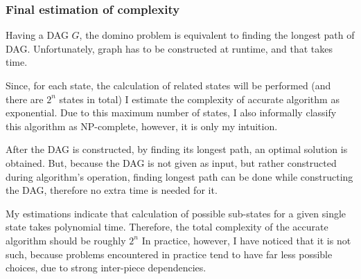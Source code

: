 \subsubsection{Final estimation of complexity}
Having a DAG $G$, the domino problem is equivalent to finding the longest path of DAG. 
Unfortunately, graph has to be constructed at runtime, and that takes time. 

Since, for each state, the calculation of related states will be performed (and there are $2^n$
states in total) I estimate the complexity of accurate algorithm as exponential. Due to this maximum
number of states, I also informally classify this algorithm as NP-complete, however, it is only my
intuition.

After the DAG is constructed, by finding its longest path, an optimal solution is obtained. But,
because the DAG is not given as input, but rather constructed during algorithm's operation, finding
longest path can be done while constructing the DAG, therefore no extra time is needed for it.

My estimations indicate that calculation of possible sub-states for a given single state takes
polynomial time. Therefore, the total complexity of the accurate algorithm should be roughly $ 2^n $
In practice, however, I have noticed that it is not such, because problems encountered in practice
tend to have far less possible choices, due to strong inter-piece dependencies.
 